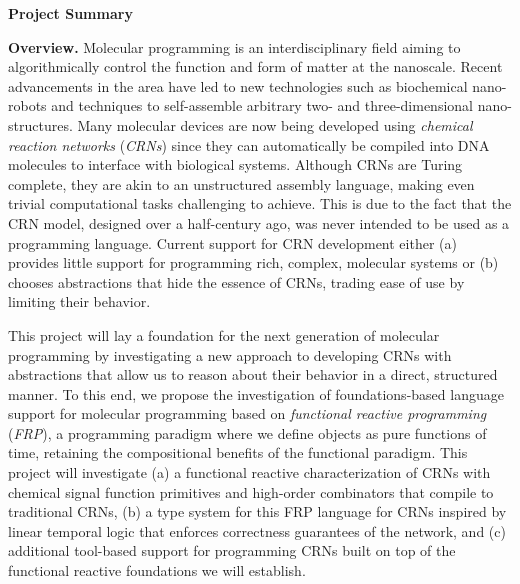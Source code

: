 \documentclass[11pt]{article}
\begin{document}
    \setcounter{page}{1}
    \begin{center}
        \vspace*{-3em}
        {\Large {\bf Project Summary}}
    \end{center}
    \vspace*{1em}

    \textbf{Overview.}
    Molecular programming is an interdisciplinary field aiming to algorithmically control the function and form of matter at the nanoscale.
    Recent advancements in the area have led to new technologies such as biochemical nano-robots and techniques to self-assemble arbitrary two- and three-dimensional nano-structures.
    Many molecular devices are now being developed using \emph{chemical reaction networks} (\emph{CRNs}) since they can automatically be compiled into DNA molecules to interface with biological systems.
    Although CRNs are Turing complete, they are akin to an unstructured assembly language, making even trivial computational tasks challenging to achieve.
    This is due to the fact that the CRN model, designed over a half-century ago, was never intended to be used as a programming language.
    Current support for CRN development either (a) provides little support for programming rich, complex, molecular systems or (b) chooses abstractions that hide the essence of CRNs, trading ease of use by limiting their behavior.

    This project will lay a foundation for the next generation of molecular programming by investigating a new approach to developing CRNs with abstractions that allow us to reason about their behavior in a direct, structured manner.
    To this end, we propose the investigation of foundations-based language support for molecular programming based on \emph{functional reactive programming} (\emph{FRP}), a programming paradigm where we define objects as pure functions of time, retaining the compositional benefits of the functional paradigm. 
    This project will investigate (a) a functional reactive characterization of CRNs with chemical signal function primitives and high-order combinators that compile to traditional CRNs, (b) a type system for this FRP language for CRNs inspired by linear temporal logic that enforces correctness guarantees of the network, and (c) additional tool-based support for programming CRNs built on top of the functional reactive foundations we will establish.
\end{document}
